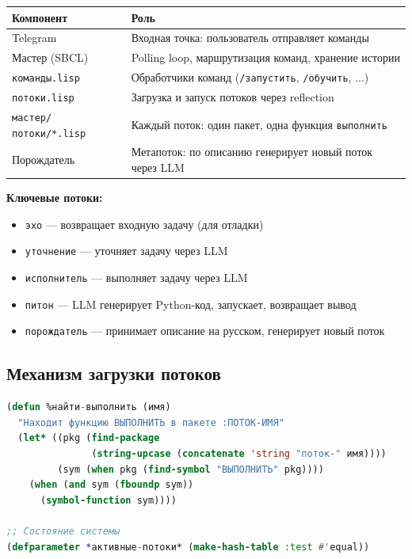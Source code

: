 \documentclass[12pt, a4paper, twoside]{article}
\begin{document}
\begin{center}
\begin{tabular}{ll}
  \toprule
  \textbf{Компонент} & \textbf{Роль} \\
  \midrule
  Telegram         & Входная точка: пользователь отправляет команды \\
  Мастер (SBCL)    & Polling loop, маршрутизация команд, хранение истории \\
  \texttt{команды.lisp} & Обработчики команд (\texttt{/запустить}, \texttt{/обучить}, ...) \\
  \texttt{потоки.lisp}  & Загрузка и запуск потоков через reflection \\
  \texttt{мастер/потоки/*.lisp} & Каждый поток: один пакет, одна функция \texttt{выполнить} \\
  Порождатель      & Метапоток: по описанию генерирует новый поток через LLM \\
  \bottomrule
\end{tabular}
\end{center}

\textbf{Ключевые потоки:}

\begin{itemize}[leftmargin=1.5em]
  \item \texttt{эхо} --- возвращает входную задачу (для отладки)
  \item \texttt{уточнение} --- уточняет задачу через LLM
  \item \texttt{исполнитель} --- выполняет задачу через LLM
  \item \texttt{питон} --- LLM генерирует Python-код, запускает, возвращает вывод
  \item \texttt{порождатель} --- принимает описание на русском, генерирует новый поток
\end{itemize}

\subsection{Механизм загрузки потоков}

\begin{lstlisting}[language=CommonLisp,caption={Reflection-based поиск функции выполнить}]
(defun %найти-выполнить (имя)
  "Находит функцию ВЫПОЛНИТЬ в пакете :ПОТОК-ИМЯ"
  (let* ((pkg (find-package
               (string-upcase (concatenate 'string "поток-" имя))))
         (sym (when pkg (find-symbol "ВЫПОЛНИТЬ" pkg))))
    (when (and sym (fboundp sym))
      (symbol-function sym))))

;; Состояние системы
(defparameter *активные-потоки* (make-hash-table :test #'equal))
\end{lstlisting}
\end{document}

